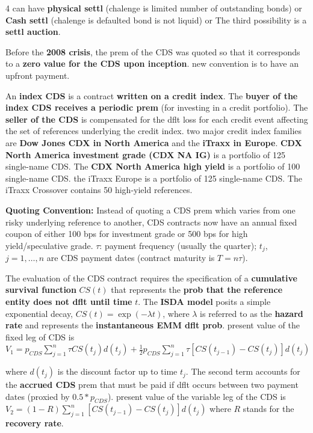 \documentclass[landscape]{article}
\newcommand{\concept}[1]{\textcolor{conceptcolor}{\textbf{#1}}}
\begin{document}
\begin{multicols}{4}
can have \textbf{physical settl} (chalenge is limited number of outstanding bonds) or \textbf{Cash settl} (chalenge is defaulted bond is not liquid) or The third possibility is a \textbf{settl auction}.

Before the \textbf{2008 crisis}, the prem of the CDS was quoted so that it corresponds to a \textbf{zero value for the CDS upon inception}. new convention is to have an upfront payment.

An \textbf{index CDS} is a contract \textbf{written on a credit index}. The \textbf{buyer of the index CDS receives a periodic prem} (for investing in a credit portfolio). The \textbf{seller of the CDS} is compensated for the dflt loss for each credit event affecting the set of references underlying the credit index.
two major credit index families are \textbf{Dow Jones CDX in North America} and the \textbf{iTraxx in Europe}. \textbf{CDX North America investment grade (CDX NA IG)} is a portfolio of 125 single-name CDS. The \textbf{CDX North America high yield} is a portfolio of 100 single-name CDS. the iTraxx Europe is a portfolio of 125 single-name CDS. The iTraxx Crossover contains 50 high-yield references.

\textcolor{subsectioncolor}{\textbf{Quoting Convention:}} Instead of quoting a CDS prem which varies from one risky underlying reference to another, CDS contracts now have an annual fixed coupon of either 100 bps for investment grade or 500 bps for high yield/speculative grade. $\tau$: payment frequency (usually the quarter); $t_j$, $j = 1, \ldots, n$ are CDS payment dates (contract maturity is $T = n\tau$).

The evaluation of the CDS contract requires the specification of a \concept{cumulative survival function} $CS(t)$ that represents the \textbf{prob that the reference entity does not dflt until time} $t$. The \concept{ISDA model} posits a simple exponential decay, $CS(t) = \exp(-\lambda t)$, where $\lambda$ is referred to as the \textbf{hazard rate} and represents the \textbf{instantaneous EMM dflt prob}.
present value of the fixed leg of CDS is $V_1 = p_{CDS} \sum_{j=1}^{n} \tau CS(t_j)d(t_j) + \frac{1}{2}p_{CDS} \sum_{j=1}^{n} \tau [CS(t_{j-1}) - CS(t_j)]d(t_j)$

where $d(t_j)$ is the discount factor up to time $t_j$. The second term accounts for the \textbf{accrued CDS} prem that must be paid if dflt occurs between two payment dates (proxied by $0.5*p_{CDS}$).
present value of the variable leg of the CDS is $V_2 = (1-R) \sum_{j=1}^{n} [CS(t_{j-1}) - CS(t_j)]d(t_j)$
   where $R$ stands for the \textbf{recovery rate}.


\end{multicols}
\end{document}

